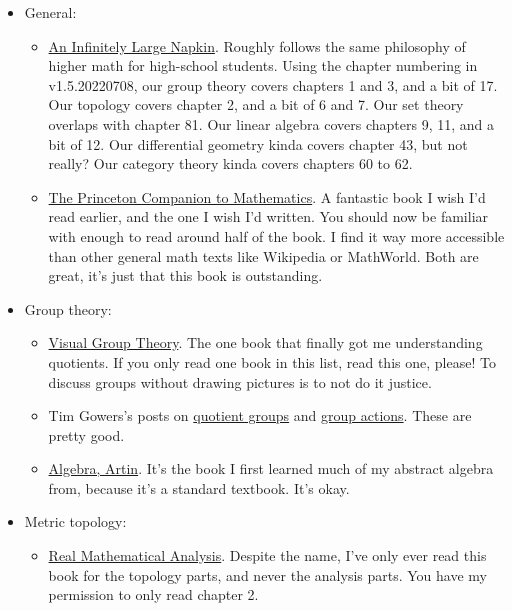 \documentclass[11pt,paper=letter]{scrartcl}
\begin{document}
\begin{itemize}
\item General:
\begin{itemize}
  \item \href{https://venhance.github.io/napkin/Napkin.pdf}{An Infinitely Large Napkin}. Roughly follows the same philosophy of higher math for high-school students. Using the chapter numbering in v1.5.20220708, our group theory covers chapters 1 and 3, and a bit of 17. Our topology covers chapter 2, and a bit of 6 and 7. Our set theory overlaps with chapter 81. Our linear algebra covers chapters 9, 11, and a bit of 12. Our differential geometry kinda covers chapter 43, but not really? Our category theory kinda covers chapters 60 to 62.
  \item \href{https://press.princeton.edu/books/hardcover/9780691118802/the-princeton-companion-to-mathematics}{The Princeton Companion to Mathematics}. A fantastic book I wish I'd read earlier, and the one I wish I'd written. You should now be familiar with enough to read around half of the book. I find it way more accessible than other general math texts like Wikipedia or MathWorld. Both are great, it's just that this book is outstanding.
\end{itemize}
\item Group theory:
\begin{itemize}
  \item \href{https://bookstore.ams.org/clrm-32/}{Visual Group Theory}. The one book that finally got me understanding quotients. If you only read one book in this list, read this one, please! To discuss groups without drawing pictures is to not do it justice.
  \item Tim Gowers's posts on \href{https://gowers.wordpress.com/2011/11/20/normal-subgroups-and-quotient-groups/}{quotient groups} and \href{https://gowers.wordpress.com/2011/11/20/normal-subgroups-and-quotient-groups/}{group actions}. These are pretty good.
  \item \href{http://home.ustc.edu.cn/~liweiyu/documents/Algebra, Second Edition, Michael Artin.pdf}{Algebra, Artin}. It's the book I first learned much of my abstract algebra from, because it's a standard textbook. It's okay.
\end{itemize}
\item Metric topology:
\begin{itemize}
  \item \href{https://link.springer.com/book/10.1007/978-3-319-17771-7}{Real Mathematical Analysis}. Despite the name, I've only ever read this book for the topology parts, and never the analysis parts. You have my permission to only read chapter 2.

\end{itemize}
\end{itemize}
\end{document}
